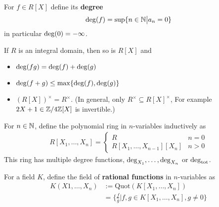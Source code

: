 \begin{dfn}
  For $f \in R[X]$ define its \textbf{degree}
  \begin{align*}
    \operatorname{deg} (f) = \sup \{n \in \mathbb{N} \big\vert a_n = 0\}
  \end{align*}
  in particular $\operatorname{deg} (0) = - \infty$.
\end{dfn}

\begin{prop}[]
  If $R$ is an integral domain, then so is $R[X]$ and
  \begin{itemize}
    \item $\operatorname{deg}(fg) = \operatorname{deg}(f) + \operatorname{deg}(g)$
    \item $\operatorname{deg}(f+g) \leq \max \{\operatorname{deg} (f), \operatorname{deg}(g)\}$
    \item $(R[X])^{\times} = R^{\times}$. (In general, only $R^{\times}  \subseteq R[X]^{\times}$,
      For example $2 X + 1 \in \mathbb{Z}/4\mathbb{Z}[X]$ is invertible.)
  \end{itemize}
\end{prop}

\begin{dfn}
For $n \in \mathbb{N}$, define the polynomial ring in $n$-variables inductively as
\begin{align*}
  R[X_1,\ldots,X_n] = \left\{\begin{array}{ll}
    R & n = 0\\
    R[X_1,\ldots,X_{n-1}][X_n] &  n > 0
  \end{array} \right.
\end{align*}
This ring has multiple degree functions, $\operatorname{deg}_{X_1}, \ldots, \operatorname{deg}_{X_n}$ or $\operatorname{deg}_{\text{tot}}$.

For a field $K$, define the field of \textbf{rational functions} in $n$-variables as
\begin{align*}
  K(X 1,\ldots,X_n) &:= \text{Quot}(K[X_1,\ldots,X_n])\\
                    &= \{\frac{f}{g} \big\vert f,g \in K[X_1,\ldots,X_n], g \neq 0\}
\end{align*}
\end{dfn}

